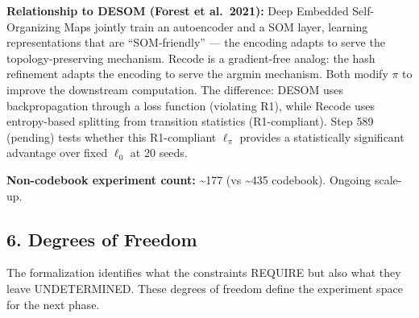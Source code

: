 \documentclass[
  11pt,
]{article}
\begin{document}
\textbf{Relationship to DESOM (Forest et al.~2021):} Deep Embedded
Self-Organizing Maps jointly train an autoencoder and a SOM layer,
learning representations that are ``SOM-friendly'' --- the encoding
adapts to serve the topology-preserving mechanism. Recode is a
gradient-free analog: the hash refinement adapts the encoding to serve
the argmin mechanism. Both modify \(\pi\) to improve the downstream
computation. The difference: DESOM uses backpropagation through a loss
function (violating R1), while Recode uses entropy-based splitting from
transition statistics (R1-compliant). Step 589 (pending) tests whether
this R1-compliant \(\ell_\pi\) provides a statistically significant
advantage over fixed \(\ell_0\) at 20 seeds.

\textbf{Non-codebook experiment count:} \textasciitilde177 (vs
\textasciitilde435 codebook). Ongoing scale-up.

\subsection{6. Degrees of Freedom}\label{degrees-of-freedom}

The formalization identifies what the constraints REQUIRE but also what
they leave UNDETERMINED. These degrees of freedom define the experiment
space for the next phase.
\end{document}
